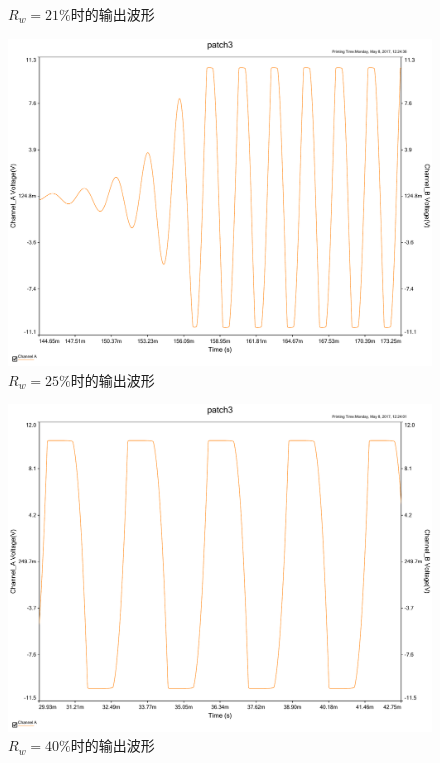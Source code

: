 \documentclass[UTF8,a4paper]{paper}
\begin{document}
\begin{multicols}{2}
\begin{figure}[H]
\caption{$R_w=21\%$时的输出波形}
\label{21}
\end{figure}
\begin{figure}[H]
\centering
\includegraphics[width=\columnwidth]{25ac.pdf}
\caption{$R_w=25\%$时的输出波形}
\label{25}
\end{figure}
\begin{figure}[H]
\centering
\includegraphics[width=\columnwidth]{40ac.pdf}
\caption{$R_w=40\%$时的输出波形}
\label{40}
\end{figure}
\begin{figure}[H]
\centering

\end{figure}
\end{multicols}
\end{document}
